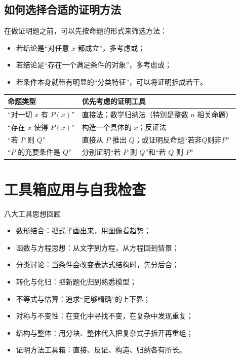 \documentclass[a4paper,11pt]{ctexart}
\begin{document}
\subsection{如何选择合适的证明方法}

在做证明题之前，可以先按命题的形式来筛选方法：
\begin{itemize}
  \item 若结论是“对任意 $x$ 都成立”，多考虑或；
  \item 若结论是“存在一个满足条件的对象”，多考虑或；
  \item 若条件本身就带有明显的“分类特征”，可以将证明拆成若干。
\end{itemize}

\begin{center}

\vspace{0.5em}
\begin{tabular}{p{} p{}}
\hline
\textbf{命题类型} & \textbf{优先考虑的证明工具} \\
\hline
“对一切 $x$ 有 $P(x)$” & 直接法；数学归纳法（特别是整数 $n$ 相关命题） \\
“存在 $x$ 使得 $P(x)$” & 构造一个具体的 $x$；反证法 \\
“若 $P$ 则 $Q$” & 直接从 $P$ 推出 $Q$；或证明反命题“若非$Q$则非$P$” \\
“$P$ 的充要条件是 $Q$” & 分别证明“若 $P$ 则 $Q$”和“若 $Q$ 则 $P$” \\
\hline
\end{tabular}
\end{center}

\section{工具箱应用与自我检查}

\begin{summarybox}{八大工具思想回顾}
\begin{itemize}
  \item 数形结合：把式子画出来，用图像看趋势；
  \item 函数与方程思想：从文字到方程，从方程回到情景；
  \item 分类讨论：当条件会改变表达式结构时，先分后合；
  \item 转化与化归：把新题化归到熟悉模型；
  \item 不等式与估算：追求“足够精确”的上下界；
  \item 对称与不变性：在变化中寻找不变，在复杂中发现重复；
  \item 结构与整体：用分块、整体代入把复杂式子拆开再重组；
  \item 证明方法工具箱：直接、反证、构造、归纳各有所长。
\end{itemize}
\end{summarybox}
\end{document}
